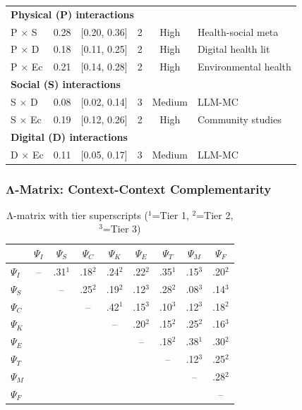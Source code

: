 \begin{longtable}{lccccl}
\multicolumn{6}{l}{\textbf{Physical (P) interactions}} \\
P $\times$ S & 0.28 & [0.20, 0.36] & 2 & High & Health-social meta \\
P $\times$ D & 0.18 & [0.11, 0.25] & 2 & High & Digital health lit \\
P $\times$ Ec & 0.21 & [0.14, 0.28] & 2 & High & Environmental health \\
\midrule

\multicolumn{6}{l}{\textbf{Social (S) interactions}} \\
S $\times$ D & 0.08 & [0.02, 0.14] & 3 & Medium & LLM-MC \\
S $\times$ Ec & 0.19 & [0.12, 0.26] & 2 & High & Community studies \\
\midrule

\multicolumn{6}{l}{\textbf{Digital (D) interactions}} \\
D $\times$ Ec & 0.11 & [0.05, 0.17] & 3 & Medium & LLM-MC \\

\end{longtable}

\subsubsection{Λ-Matrix: Context-Context Complementarity}

\begin{table}[h]
\centering
\small
\begin{tabular}{l|cccccccc}
& $\Psi_I$ & $\Psi_S$ & $\Psi_C$ & $\Psi_K$ & $\Psi_E$ & $\Psi_T$ & $\Psi_M$ & $\Psi_F$ \\
\hline
$\Psi_I$ & -- & .31$^1$ & .18$^2$ & .24$^2$ & .22$^2$ & .35$^1$ & .15$^3$ & .20$^2$ \\
$\Psi_S$ & & -- & .25$^2$ & .19$^2$ & .12$^3$ & .28$^2$ & .08$^3$ & .14$^3$ \\
$\Psi_C$ & & & -- & .42$^1$ & .15$^3$ & .10$^3$ & .12$^3$ & .18$^2$ \\
$\Psi_K$ & & & & -- & .20$^2$ & .15$^2$ & .25$^2$ & .16$^3$ \\
$\Psi_E$ & & & & & -- & .18$^2$ & .38$^1$ & .30$^2$ \\
$\Psi_T$ & & & & & & -- & .12$^3$ & .25$^2$ \\
$\Psi_M$ & & & & & & & -- & .28$^2$ \\
$\Psi_F$ & & & & & & & & -- \\
\end{tabular}
\caption{Λ-matrix with tier superscripts ($^1$=Tier 1, $^2$=Tier 2, $^3$=Tier 3)}
\label{tab:lambda-full}
\end{table}

